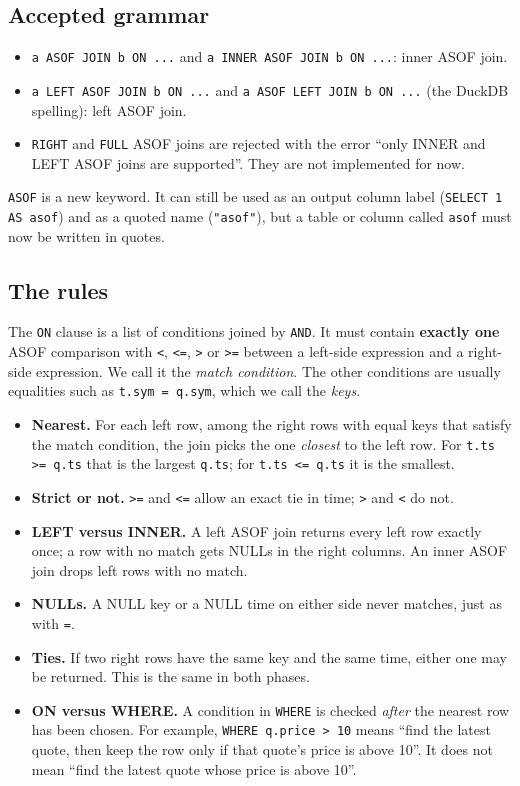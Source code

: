 \documentclass[11pt,a4paper]{article}
\newcommand{\code}[1]{\texttt{#1}}
\begin{document}
\subsection{Accepted grammar}

\begin{itemize}
  \item \code{a ASOF JOIN b ON ...} and \code{a INNER ASOF JOIN b ON ...}: inner ASOF join.
  \item \code{a LEFT ASOF JOIN b ON ...} and \code{a ASOF LEFT JOIN b ON ...} (the
        DuckDB spelling): left ASOF join.
  \item \code{RIGHT} and \code{FULL} ASOF joins are rejected with the error ``only INNER
        and LEFT ASOF joins are supported''. They are not implemented for now.
\end{itemize}

\code{ASOF} is a new keyword. It can still be used as an output column label
(\code{SELECT 1 AS asof}) and as a quoted name (\code{"asof"}), but a table or column
called \code{asof} must now be written in quotes.

\subsection{The rules}

The \code{ON} clause is a list of conditions joined by \code{AND}. It must contain
\textbf{exactly one} ASOF comparison with \code{<}, \code{<=}, \code{>} or \code{>=} between a
left-side expression and a right-side expression. We call it the \emph{match condition}.
The other conditions are usually equalities such as \code{t.sym = q.sym}, which we call
the \emph{keys}.

\begin{itemize}
  \item \textbf{Nearest.} For each left row, among the right rows with equal keys that
        satisfy the match condition, the join picks the one \emph{closest} to the left
        row. For \code{t.ts >= q.ts} that is the largest \code{q.ts}; for
        \code{t.ts <= q.ts} it is the smallest.
  \item \textbf{Strict or not.} \code{>=} and \code{<=} allow an exact tie in time;
        \code{>} and \code{<} do not.
  \item \textbf{LEFT versus INNER.} A left ASOF join returns every left row exactly once;
        a row with no match gets NULLs in the right columns. An inner ASOF join drops
        left rows with no match.
  \item \textbf{NULLs.} A NULL key or a NULL time on either side never matches, just as
        with \code{=}.
  \item \textbf{Ties.} If two right rows have the same key and the same time, either one
        may be returned. This is the same in both phases.
  \item \textbf{ON versus WHERE.} A condition in \code{WHERE} is checked \emph{after} the
        nearest row has been chosen. For example, \code{WHERE q.price > 10} means ``find
        the latest quote, then keep the row only if that quote's price is above 10''. It
        does not mean ``find the latest quote whose price is above 10''.
\end{itemize}
\end{document}
